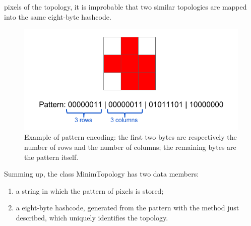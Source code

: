 pixels of the topology, it is improbable that two similar topologies are mapped into the same eight-byte hashcode.\\
\begin{figure}
  \centering
  \includegraphics[scale=0.5]{figures/pattern.png}
  \caption{Example of pattern encoding: the first two bytes are respectively the number of rows and the number of columns; the remaining bytes are the pattern itself.}
  \label{fig:pattern}
\end{figure}
%
Summing up, the class MinimTopology has two data members:
\begin{enumerate}
 \item a string in which the pattern of pixels is stored;
 \item a eight-byte hashcode, generated from the pattern with the method just described, which uniquely identifies the topology.
\end{enumerate}
%
